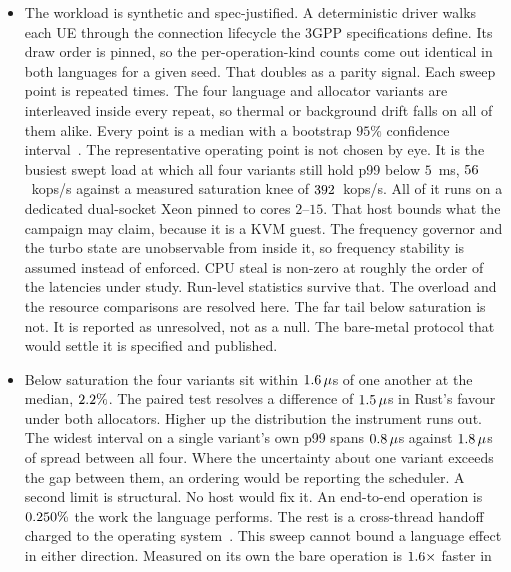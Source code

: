 \documentclass[english,twoside,openright,a4paper,censored,csm,software-track-2020]{HYthesisML}
\begin{document}
\begin{itemize}
  \item The workload is synthetic and spec-justified. A deterministic driver walks each UE
        through the connection lifecycle the 3GPP specifications define. Its draw order is pinned,
        so the per-operation-kind counts come out identical in both languages for a given seed.
        That doubles as a parity signal. Each sweep point is repeated \NRepeats{} times. The
        four language and allocator variants are interleaved inside every repeat, so thermal or
        background drift falls on all of them alike. Every point is a median with a bootstrap
        $95\%$ confidence interval~\cite{georges2007rigorous,efron1993bootstrap}. The
        representative operating point is not chosen by eye. It is the busiest swept load at
        which all four variants still hold p99 below $5$~ms, $56$~kops/s against a
        measured saturation knee of $392$~kops/s. All of it runs on a dedicated dual-socket
        Xeon pinned to cores $2$--$15$. That host bounds what the campaign may claim, because it
        is a KVM guest. The frequency governor and the turbo state are unobservable from inside
        it, so frequency stability is assumed instead of enforced. CPU steal is non-zero at
        roughly the order of the latencies under study. Run-level statistics survive that. The
        overload and the resource comparisons are resolved here. The far tail below saturation
        is not. It is reported as unresolved, not as a null. The bare-metal protocol that would
        settle it is specified and published.
  \item Below saturation the four variants sit within $1.6\,\mu$s of one another at the
        median, $2.2\%$. The paired test resolves a difference of
        $1.5\,\mu$s in Rust's favour under both allocators. Higher up the
        distribution the instrument runs out. The widest interval on a single variant's own p99
        spans $0.8\,\mu$s against $1.8\,\mu$s of spread between all
        four. Where the uncertainty about one variant exceeds the gap between them, an ordering
        would be reporting the scheduler. A second limit is structural. No host would fix it. An
        end-to-end operation is $0.250\%$ the work the language performs. The rest
        is a cross-thread handoff charged to the operating
        system~\cite{zhou2025oltp}. This sweep cannot bound a language effect in either
        direction. Measured on its own the bare operation is $1.6\times$ faster in

\end{itemize}
\end{document}
